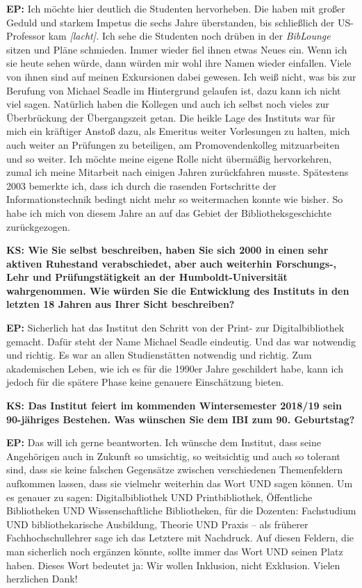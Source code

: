 \documentclass[a4paper,
fontsize=11pt,
oneside,
numbers=noperiodatend,
parskip=half-,
bibliography=totoc,
final
]{scrartcl}
\begin{document}
\textbf{EP:} Ich möchte hier deutlich die Studenten hervorheben. Die
haben mit großer Geduld und starkem Impetus die sechs Jahre überstanden,
bis schließlich der US-Professor kam \emph{{[}lacht{]}.} Ich sehe die
Studenten noch drüben in der \emph{BibLounge} sitzen und Pläne
schmieden. Immer wieder fiel ihnen etwas Neues ein. Wenn ich sie heute
sehen würde, dann würden mir wohl ihre Namen wieder einfallen. Viele von
ihnen sind auf meinen Exkursionen dabei gewesen. Ich weiß nicht, was bis
zur Berufung von Michael Seadle im Hintergrund gelaufen ist, dazu kann
ich nicht viel sagen. Natürlich haben die Kollegen und auch ich selbst
noch vieles zur Überbrückung der Übergangszeit getan. Die heikle Lage
des Instituts war für mich ein kräftiger Anstoß dazu, als Emeritus
weiter Vorlesungen zu halten, mich auch weiter an Prüfungen zu
beteiligen, am Promovendenkolleg mitzuarbeiten und so weiter. Ich möchte
meine eigene Rolle nicht übermäßig hervorkehren, zumal ich meine
Mitarbeit nach einigen Jahren zurückfahren musste. Spätestens 2003
bemerkte ich, dass ich durch die rasenden Fortschritte der
Informationstechnik bedingt nicht mehr so weitermachen konnte wie
bisher. So habe ich mich von diesem Jahre an auf das Gebiet der
Bibliotheksgeschichte zurückgezogen.

\textbf{KS: Wie Sie selbst beschreiben, haben Sie sich 2000 in einen
sehr aktiven Ruhestand verabschiedet, aber auch weiterhin Forschungs-,
Lehr und Prüfungstätigkeit an der Humboldt-Universität wahrgenommen. Wie
würden Sie die Entwicklung des Instituts in den letzten 18 Jahren aus
Ihrer Sicht beschreiben?}

\textbf{EP:} Sicherlich hat das Institut den Schritt von der Print- zur
Digitalbibliothek gemacht. Dafür steht der Name Michael Seadle
eindeutig. Und das war notwendig und richtig. Es war an allen
Studienstätten notwendig und richtig. Zum akademischen Leben, wie ich es
für die 1990er Jahre geschildert habe, kann ich jedoch für die spätere
Phase keine genauere Einschätzung bieten.

\textbf{KS: Das Institut feiert im kommenden Wintersemester 2018/19 sein
90-jähriges Bestehen. Was wünschen Sie dem IBI zum 90. Geburtstag?}

\textbf{EP:} Das will ich gerne beantworten. Ich wünsche dem Institut,
dass seine Angehörigen auch in Zukunft so umsichtig, so weitsichtig und
auch so tolerant sind, dass sie keine falschen Gegensätze zwischen
verschiedenen Themenfeldern aufkommen lassen, dass sie vielmehr
weiterhin das Wort UND sagen können. Um es genauer zu sagen:
Digitalbibliothek UND Printbibliothek, Öffentliche Bibliotheken UND
Wissenschaftliche Bibliotheken, für die Dozenten: Fachstudium UND
bibliothekarische Ausbildung, Theorie UND Praxis -- als früherer
Fachhochschullehrer sage ich das Letztere mit Nachdruck. Auf diesen
Feldern, die man sicherlich noch ergänzen könnte, sollte immer das Wort
UND seinen Platz haben. Dieses Wort bedeutet ja: Wir wollen Inklusion,
nicht Exklusion. Vielen herzlichen Dank!
\end{document}

